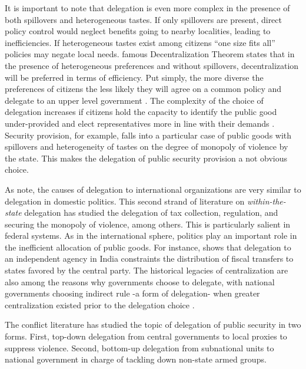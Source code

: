 \documentclass[12pt]{amsart}
\numberwithin{equation}{section}
\theoremstyle{definition}
\theoremstyle{definition}
\theoremstyle{definition}
\begin{document}
It is important to note that delegation is even more complex in the presence of both spillovers and heterogeneous tastes. If only spillovers are present, direct policy control would neglect benefits going to nearby localities, leading to inefficiencies. If heterogeneous tastes exist among citizens ``one size fits all” policies may negate local needs. \citet{oates_1972} famous Decentralization Theorem states that in the presence of heterogeneous preferences and without spillovers, decentralization will be preferred in terms of efficiency. Put simply, the more diverse the preferences of citizens the less likely they will agree on a common policy and delegate to an upper level government \citep{martin_2006, lyne_etal_2006}. The complexity of the choice of delegation increases if citizens hold the capacity to identify the public good under-provided and elect representatives more in line with their demands \citet{besley_oates_2003}. Security provision, for example, falls into a particular case of public goods with spillovers and heterogeneity of tastes on the degree of monopoly of violence by the state. This makes the delegation of public security provision a not obvious choice. 

As \citet{ Hawkins_etal_2006} note, the causes of delegation to international organizations are very similar to delegation in domestic politics. This second strand of literature on \emph{within-the-state} delegation has studied the delegation of tax collection, regulation, and securing the monopoly of violence, among others. This is particularly salient in federal systems. As in the international sphere, politics play an important role in the inefficient allocation of public goods. For instance, \citet{khemani_2007} shows that delegation to an independent agency in India constraints the distribution of fiscal transfers to states favored by the central party. The historical legacies of centralization are also among the reasons why governments choose to delegate, with national governments choosing indirect rule -a form of delegation- when greater centralization existed prior to the delegation choice \citep{gerring_etal_2011}.  

The conflict literature has studied the topic of delegation of public security in two forms. First, top-down delegation from central governments to local proxies to suppress violence. Second, bottom-up delegation from subnational units to national government in charge of tackling down non-state armed groups. 
\end{document}
